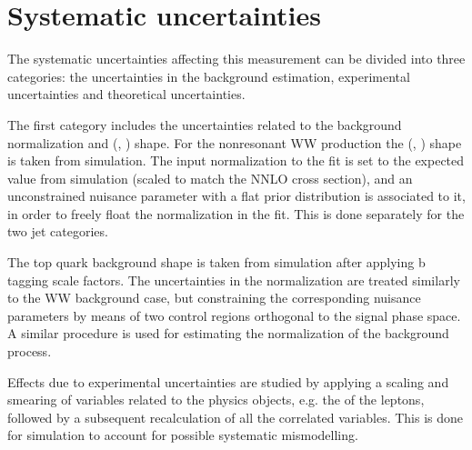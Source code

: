 \section{Systematic uncertainties}\label{chap5:systs}

The systematic uncertainties affecting this measurement can be divided into three categories: the uncertainties in the background estimation, experimental uncertainties and theoretical uncertainties.

The first category includes the uncertainties related to the background normalization and (\mll, \mt) shape. For the nonresonant WW production the (\mll, \mt) shape is taken from simulation. The input normalization to the fit is set to the expected value from simulation (scaled to match the NNLO cross section), and an unconstrained nuisance parameter with a flat prior distribution is associated to it, in order to freely float the normalization in the fit. This is done separately for the two jet categories.

The top quark background shape is taken from simulation after applying b tagging scale factors. The uncertainties in the normalization are treated similarly to the WW background case, but constraining the corresponding nuisance parameters by means of two control regions orthogonal to the signal phase space. A similar procedure is used for estimating the normalization of the \dytt background process.

Effects due to experimental uncertainties are studied by applying a scaling and smearing of variables related to the physics objects, e.g. the \pt of the leptons, followed by a subsequent recalculation of all the correlated variables. This is done for simulation to account for possible systematic mismodelling.

